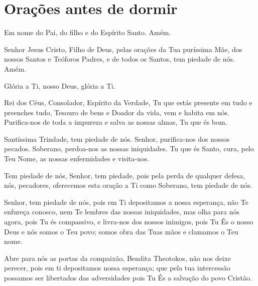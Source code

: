 \documentclass{subfiles}
\begin{document}
\chapter{Orações antes de dormir}

Em nome do Pai, do filho e do Espírito Santo. Amém. 
 
Senhor Jesus Cristo, Filho de Deus, pelas orações da Tua puríssima 
Mãe, dos nossos Santos e Teóforos Padres, e de todos os Santos, tem piedade 
de nós. Amém. 
 
Glória a Ti, nosso Deus, glória a Ti. 
 
Rei dos Céus, Consolador, Espírito da Verdade, Tu que estás presente 
em tudo e preenches tudo, Tesouro de bens e Doador da vida, vem e habita 
em nós. Purifica-nos de toda a impureza e salva as nossas almas, Tu que és 
bom. 
 
\trisagion{} \thrice{}

\Doxology{}
 
Santíssima Trindade, tem piedade de nós. Senhor, purifica-nos dos 
nossos pecados. Soberano, perdoa-nos as nossas iniquidades. Tu que és Santo, 
cura, pelo Teu Nome, as nossas enfermidades e visita-nos. 
 
\mercy{} \thrice{}
 
\Doxology{}
 
\ourFather{}


Tem piedade de nós, Senhor, tem piedade, pois pela perda de qualquer defesa,
nós, pecadores, oferecemos esta oração a Ti como Soberano, tem piedade de nós. 
 
\doxology{}

Senhor, tem piedade de nós, pois em Ti depositamos a nossa esperança, não Te
enfureça conosco, nem Te lembres das nossas iniquidades, mas olha para nós
agora, pois Tu és compassivo, e livra-nos dos nossos inimigos, pois Tu És o
nosso Deus e nós somos o Teu povo; somos obra das Tuas mãos e clamamos o Teu
nome. 
 
\nowandever{}

Abre para nós as portas da compaixão, Bendita Theotokos, não nos deixe perecer,
pois em ti depositamos nossa esperança; que pela tua intercessão possamos ser
libertados das adversidades pois Tu És a salvação do povo Cristão.

\mercy{} 

 
\end{document}
